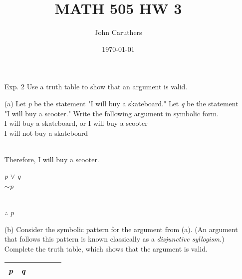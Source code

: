 \documentclass{article}
\title{MATH 505 HW 3}
\author{John Caruthers}
\date\today
\begin{document}
\maketitle

\begin{itemize}
    \item[Exp. 2] Use a truth table to show that an argument is valid.
    
    (a) Let \emph{p} be the statement "I will buy a skateboard." Let \emph{q} be the statement "I will buy a scooter." Write the following argument in symbolic form.\\
    \hspace*{1cm} I will buy a skateboard, or I will buy a scooter\\
    \hspace*{1cm} I will not buy a skateboard\\
    \\
    \hspace*{1cm} Therefore, I will buy a scooter.
    
    \hspace*{1cm} {\color{blue} \emph{p} $\vee$ \emph{q}}\\
    \hspace*{1cm} {\color{blue} $\sim$\emph{p}}\\
    \\
    \hspace*{1cm} {\color{blue} $\therefore$ \emph{p}}
    
    (b) Consider the symbolic pattern for the argument from (a). (An argument that follows this pattern is known classically as a \emph{disjunctive syllogism.}) Complete the truth table, which shows that the argument is valid.
    
    \begin{center}
        \begin{tabular}{|c|c|c|c|c|c|}
            \hline
            \emph{p} & \emph{q} & \emph{} &  &  &\\
            \hline
        \end{tabular}
    \end{center}
    

\end{itemize}
\end{document}
